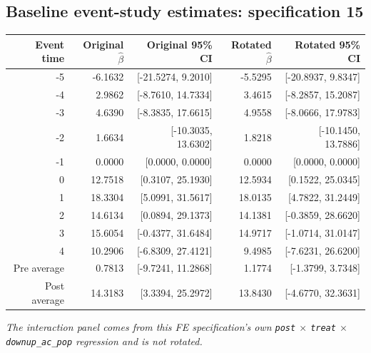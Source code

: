 \documentclass[10pt]{article}
\begin{document}
\subsection*{Baseline event-study estimates: specification 15}
\begin{center}
\scriptsize
\begin{tabular}{r rr rr}
\toprule
Event time & Original $\hat\beta$ & Original 95\% CI & Rotated $\hat\beta$ & Rotated 95\% CI \\
\midrule
-5 & -6.1632 & [-21.5274, 9.2010] & -5.5295 & [-20.8937, 9.8347] \\
-4 & 2.9862 & [-8.7610, 14.7334] & 3.4615 & [-8.2857, 15.2087] \\
-3 & 4.6390 & [-8.3835, 17.6615] & 4.9558 & [-8.0666, 17.9783] \\
-2 & 1.6634 & [-10.3035, 13.6302] & 1.8218 & [-10.1450, 13.7886] \\
-1 & 0.0000 & [0.0000, 0.0000] & 0.0000 & [0.0000, 0.0000] \\
0 & 12.7518 & [0.3107, 25.1930] & 12.5934 & [0.1522, 25.0345] \\
1 & 18.3304 & [5.0991, 31.5617] & 18.0135 & [4.7822, 31.2449] \\
2 & 14.6134 & [0.0894, 29.1373] & 14.1381 & [-0.3859, 28.6620] \\
3 & 15.6054 & [-0.4377, 31.6484] & 14.9717 & [-1.0714, 31.0147] \\
4 & 10.2906 & [-6.8309, 27.4121] & 9.4985 & [-7.6231, 26.6200] \\
\midrule
Pre average & 0.7813 & [-9.7241, 11.2868] & 1.1774 & [-1.3799, 3.7348] \\
Post average & 14.3183 & [3.3394, 25.2972] & 13.8430 & [-4.6770, 32.3631] \\
\bottomrule
\end{tabular}
\end{center}
\medskip
\textit{The interaction panel comes from this FE specification's own \texttt{post} $\times$ \texttt{treat} $\times$ \texttt{downup\_ac\_pop} regression and is not rotated.}
\clearpage
\end{document}
